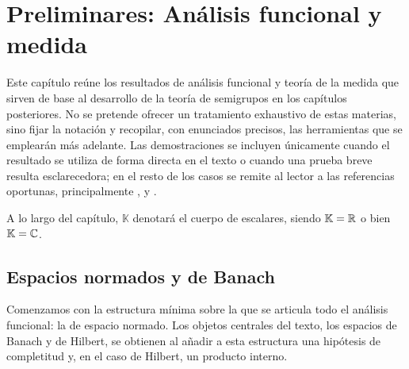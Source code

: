 \chapter{Preliminares: Análisis funcional y medida}
\label{ch:preliminares}


Este capítulo reúne los resultados de análisis funcional y teoría de la medida
que sirven de base al desarrollo de la teoría de semigrupos en los capítulos
posteriores. No se pretende ofrecer un tratamiento exhaustivo de estas materias,
sino fijar la notación y recopilar, con enunciados precisos, las herramientas que
se emplearán más adelante. Las demostraciones se incluyen únicamente cuando el
resultado se utiliza de forma directa en el texto o cuando una prueba breve
resulta esclarecedora; en el resto de los casos se remite al lector a las
referencias oportunas, principalmente \cite{brezis-2011-fun-ana-sob},
\cite{conway-1990-cou-fun-ana} y \cite{pazy-1983-sem-lin-ope}.

A lo largo del capítulo, $\mathbb{K}$ denotará el cuerpo de escalares, siendo
$\mathbb{K} = \mathbb{R}$ o bien $\mathbb{K} = \mathbb{C}$.

\section{Espacios normados y de Banach}
\label{ch:preliminares:section:Banach}

Comenzamos con la estructura mínima sobre la que se articula todo el análisis
funcional: la de espacio normado. Los objetos centrales del texto, los espacios
de Banach y de Hilbert, se obtienen al añadir a esta estructura una hipótesis de
completitud y, en el caso de Hilbert, un producto interno.\\

